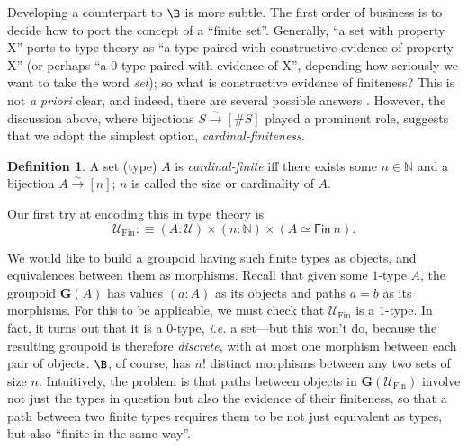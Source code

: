 \documentclass[preprint,authoryear]{sigplanconf}
\newcommand{\ie}{\latin{i.e.}\xspace}
\newcommand{\term}[1]{\emph{#1}}
\newcommand{\latin}[1]{\textit{#1}}
\newcommand{\bbb}[1]{\ensuremath{\mathbb{#1}}\xspace}
\providecommand{\N}{\bbb{N}}
\newcommand{\bij}{\stackrel{\sim}{\longrightarrow}}
\let\oldequiv\equiv
\newcommand{\jeq}{\oldequiv}          %
\newcommand{\defeq}{\mathrel{:\jeq}}  %
\renewcommand{\equiv}{\simeq}         %
\theoremstyle{definition}
\newtheorem{defn}[thm]{Definition}
\theoremstyle{remark}
\newcommand{\cons}[1]{\ensuremath{\mathsf{#1}}}
\newcommand{\Type}{\ensuremath{\mathcal{U}}}
\newcommand{\FinType}{\ensuremath{\Type_{\text{Fin}}}}
\newcommand{\sizesymb}{\#}
\newcommand{\size}[1]{\ensuremath{\sizesymb#1}}
\newcommand{\Fin}[1]{\ensuremath{\cons{Fin}\ #1}}
\newcommand{\tygrpd}[1]{\ensuremath{\mathbf{G}(#1)}}
\newcommand{\fin}[1]{\ensuremath{[#1]}}
\begin{document}
Developing a counterpart to $\B$ is more subtle.  The first order of
business is to decide how to port the concept of a ``finite set''.
Generally, ``a set with property X'' ports to type theory as ``a type
paired with constructive evidence of property X'' (or perhaps ``a
$0$-type paired with evidence of X'', depending how seriously we want
to take the word \emph{set}); so what is constructive evidence of
finiteness? This is not \latin{a priori} clear, and indeed, there are
several possible answers \citep{finite}. However, the discussion
above, where bijections $S \bij \fin{\size S}$ played a prominent
role, suggests that we adopt the simplest option,
\term{cardinal-finiteness}.
\begin{defn}
  A set (type) $A$ is \term{cardinal-finite} iff there exists some $n
  \in \N$ and a bijection $A \bij \fin n$; $n$ is called the size or
  cardinality of $A$.
\end{defn}
Our first try at encoding this in type theory is
\[ \FinType \defeq (A : \Type) \times (n : \N) \times (A \equiv \Fin n). \]

We would like to build a groupoid having such finite types as objects,
and equivalences between them as morphisms.  Recall that given some
$1$-type $A$, the groupoid $\tygrpd{A}$ has values $(a : A)$ as its
objects and paths $a = b$ as its morphisms.  For this to be
applicable, we must check that $\FinType$ is a $1$-type. In fact, it
turns out that it is a $0$-type, \ie a set---but this won't do,
because the resulting groupoid is therefore \emph{discrete}, with at
most one morphism between each pair of objects. $\B$, of course, has
$n!$ distinct morphisms between any two sets of size $n$.
Intuitively, the problem is that paths between objects in
$\tygrpd{\FinType}$ involve not just the types in question but also
the evidence of their finiteness, so that a path between two finite
types requires them to be not just equivalent as types, but also
``finite in the same way''.
\end{document}

